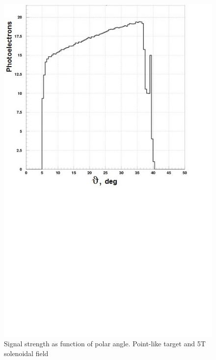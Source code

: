 \begin{figure}[!ht]
    \centering
    \includegraphics[width=1.0\linewidth,trim={0.0cm 9.4cm 0.0cm 0.0cm},clip]{images/Point_Targ_5T_Field_Theta.jpg}
    \caption{Signal strength as function of polar angle. Point-like target and 5T solenoidal field}
    \label{fig:Point_Targ_5T_Field_Theta}
\end{figure}


